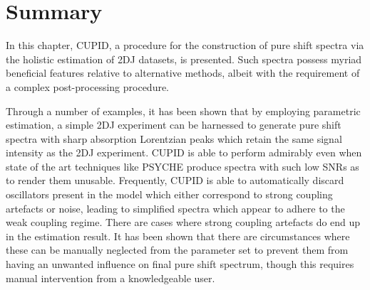 \section{Summary}
In this chapter, \ac{CUPID}, a procedure for the construction of pure shift
spectra via the holistic estimation of \ac{2DJ} datasets, is presented.
Such spectra possess myriad beneficial features relative to alternative
methods, albeit with the requirement of a complex post-processing procedure.



Through a number of examples, it has been shown that by employing parametric
estimation, a simple \ac{2DJ} experiment can be harnessed to generate pure
shift spectra with sharp absorption Lorentzian peaks which retain the same
signal intensity as the \ac{2DJ} experiment. \ac{CUPID} is able to perform
admirably even when state of the art techniques like \ac{PSYCHE} produce
spectra with such low \acp{SNR} as to render them unusable. Frequently, \ac{CUPID}
is able to automatically discard oscillators present in the model which either
correspond to strong coupling artefacts or noise, leading to simplified spectra
which appear to adhere to the weak coupling regime. There are cases where
strong coupling artefacts do end up in the estimation result. It has been shown
that there are circumstances where these can be manually neglected from the
parameter set to prevent them from having an unwanted influence on final pure
shift spectrum, though this requires manual intervention from a knowledgeable
user.

